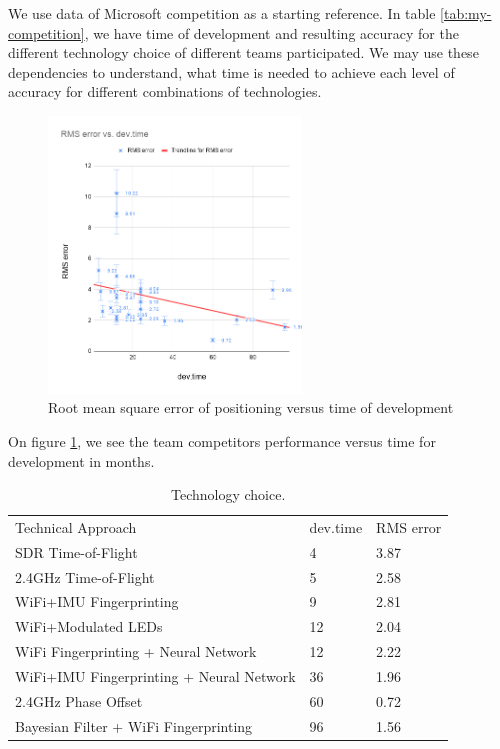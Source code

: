 We use data of Microsoft competition as a starting reference. In table \ref{tab:my-competition}, we have time of development and resulting accuracy for the different technology choice of different teams participated.
We may use these dependencies to understand, what time is needed to achieve each level of accuracy for different combinations of technologies.

\begin{figure}
	\includegraphics[width=0.6\textwidth]{graphics/roadmap/RMSerrorvsdevtime.png}
	\caption{Root mean square error of positioning versus time of development}
	\label{im:rmse}
\end{figure}

On figure \ref{im:rmse}, we see the team competitors performance versus time for development in months.

\begin{table}[]
	\caption{Technology choice.}
	\label{tab:best-tech}
	\begin{tabular}{lll}
		Technical Approach & dev.time & RMS error \\
		SDR Time-of-Flight & 4 & 3.87 \\
		2.4GHz Time-of-Flight & 5 & 2.58 \\
		WiFi+IMU Fingerprinting & 9 & 2.81 \\
		WiFi+Modulated LEDs & 12 & 2.04 \\
		WiFi Fingerprinting + Neural Network & 12 & 2.22 \\
		WiFi+IMU Fingerprinting + Neural Network & 36 & 1.96 \\
		2.4GHz Phase Offset & 60 & 0.72 \\
		Bayesian Filter + WiFi Fingerprinting & 96 & 1.56
	\end{tabular}%
\end{table}

